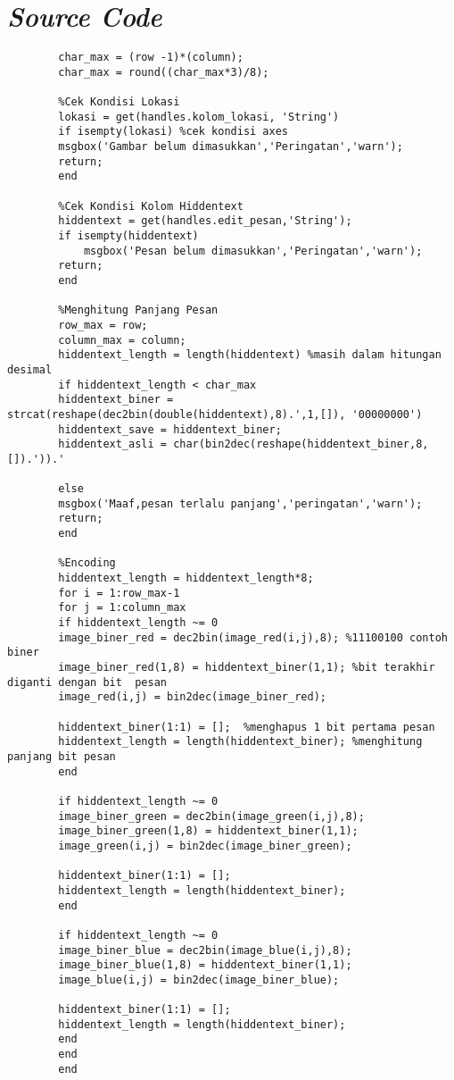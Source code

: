 \appendix 
\chapter{\emph{Source Code}}
	\begin{verbatim}
		char_max = (row -1)*(column);
		char_max = round((char_max*3)/8);
		
		%Cek Kondisi Lokasi
		lokasi = get(handles.kolom_lokasi, 'String')
		if isempty(lokasi) %cek kondisi axes
		msgbox('Gambar belum dimasukkan','Peringatan','warn');
		return;    
		end		
	
		%Cek Kondisi Kolom Hiddentext
		hiddentext = get(handles.edit_pesan,'String');
		if isempty(hiddentext)
			msgbox('Pesan belum dimasukkan','Peringatan','warn');
		return;    
		end
	
		%Menghitung Panjang Pesan
		row_max = row;
		column_max = column;
		hiddentext_length = length(hiddentext) %masih dalam hitungan desimal
		if hiddentext_length < char_max 
		hiddentext_biner = strcat(reshape(dec2bin(double(hiddentext),8).',1,[]), '00000000')
		hiddentext_save = hiddentext_biner;
		hiddentext_asli = char(bin2dec(reshape(hiddentext_biner,8,[]).')).'
		
		else
		msgbox('Maaf,pesan terlalu panjang','peringatan','warn');
		return;
		end
	
		%Encoding
		hiddentext_length = hiddentext_length*8;
		for i = 1:row_max-1
		for j = 1:column_max    
		if hiddentext_length ~= 0
		image_biner_red = dec2bin(image_red(i,j),8); %11100100 contoh biner
		image_biner_red(1,8) = hiddentext_biner(1,1); %bit terakhir diganti dengan bit  pesan
		image_red(i,j) = bin2dec(image_biner_red); 
		
		hiddentext_biner(1:1) = [];  %menghapus 1 bit pertama pesan
		hiddentext_length = length(hiddentext_biner); %menghitung panjang bit pesan            
		end
		
		if hiddentext_length ~= 0
		image_biner_green = dec2bin(image_green(i,j),8);
		image_biner_green(1,8) = hiddentext_biner(1,1);
		image_green(i,j) = bin2dec(image_biner_green);
		
		hiddentext_biner(1:1) = []; 
		hiddentext_length = length(hiddentext_biner); 
		end
		
		if hiddentext_length ~= 0
		image_biner_blue = dec2bin(image_blue(i,j),8);
		image_biner_blue(1,8) = hiddentext_biner(1,1); 
		image_blue(i,j) = bin2dec(image_biner_blue); 
		
		hiddentext_biner(1:1) = []; 
		hiddentext_length = length(hiddentext_biner); 
		end
		end
		end
		

\end{verbatim}
